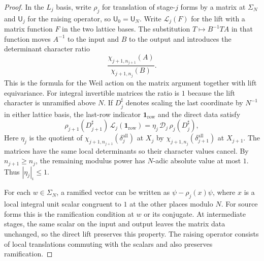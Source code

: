 \begin{proof}
In the $L_j$ basis, write $\rho_j$ for translation of stage-$j$ forms by a matrix at $\Sigma_N$ and $\mathsf U_j$ for the raising operator, so $\mathsf U_0=\mathsf U_N$. Write $\mathcal L_j(F)$ for the lift with a matrix function $F$ in the two lattice bases. The substitution $T\mapsto B^{-1}TA$ in that function moves $A^{-1}$ to the input and $B$ to the output and introduces the determinant character ratio
\[
 \frac{\chi_{j+1,n_{j+1}}(A)}{\chi_{j+1,n_j}(B)} .
\]
This is the formula for the Weil action on the matrix argument together with lift equivariance. For integral invertible matrices the ratio is $1$ because the lift character is unramified above $N$. If $D_j^\sharp$ denotes scaling the last coordinate by $N^{-1}$ in either lattice basis, the last-row indicator $\mathbf 1_{\mathrm{row}}$ and the direct data satisfy
\[
 \rho_{j+1}(D_{j+1}^\sharp)\,\mathcal L_j(\mathbf 1_{\mathrm{row}})
   =\eta_j\,\mathcal D_j\,\rho_j(D_j^\sharp),
\]
Here $\eta_j$ is the quotient of $\chi_{j+1,n_{j+1}}(\delta_j^{\mathrm{all}})$ at $X_j$ by $\chi_{j+1,n_j}(\delta_{j+1}^{\mathrm{all}})$ at $X_{j+1}$. The matrices have the same local determinants so their character values cancel. By $n_{j+1}\ge n_j$, the remaining modulus power has $N$-adic absolute value at most $1$. Thus $|\eta_j|_\iota\le1$.

For each $w\in\Sigma_N$, a ramified vector can be written as $\psi-\rho_j(x)\psi$, where $x$ is a local integral unit scalar congruent to $1$ at the other places modulo $N$. For source forms this is the ramification condition at $w$ or its conjugate. At intermediate stages, the same scalar on the input and output leaves the matrix data unchanged, so the direct lift preserves this property. The raising operator consists of local translations commuting with the scalars and also preserves ramification.


\end{proof}
